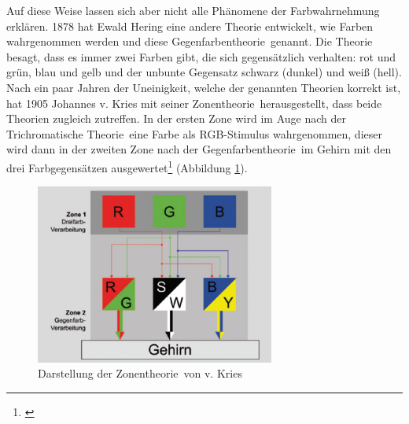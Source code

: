 
\noindent Auf diese Weise lassen sich aber nicht alle Phänomene der Farbwahrnehmung erklären. 1878 hat Ewald Hering eine andere Theorie entwickelt, wie Farben wahrgenommen werden und diese \glqq Gegenfarbentheorie\grqq\ genannt. Die Theorie besagt, dass es immer zwei Farben gibt, die sich gegensätzlich verhalten: rot und grün, blau und gelb und der unbunte Gegensatz schwarz (dunkel) und weiß (hell).\\ Nach ein paar Jahren der Uneinigkeit, welche der genannten Theorien korrekt ist, hat 1905 Johannes v. Kries mit seiner \glqq Zonentheorie\grqq\ herausgestellt, dass beide Theorien zugleich zutreffen. In der ersten Zone wird im Auge nach der \glqq Trichromatische Theorie\grqq\ eine Farbe als RGB-Stimulus wahrgenommen, dieser wird dann in der zweiten Zone nach der \glqq Gegenfarbentheorie\grqq\ im Gehirn mit den drei Farbgegensätzen ausgewertet\footnote{\cite[104]{hentschel}} (Abbildung \ref{b_zonen}).
 
\begin{figure}[H]     %
\centering
\includegraphics[width=0.7\textwidth]{bilder/zonen} 
\caption {Darstellung der \glqq Zonentheorie\grqq\ von v. Kries \protect\footnotemark}\label{b_zonen}
\end{figure}

